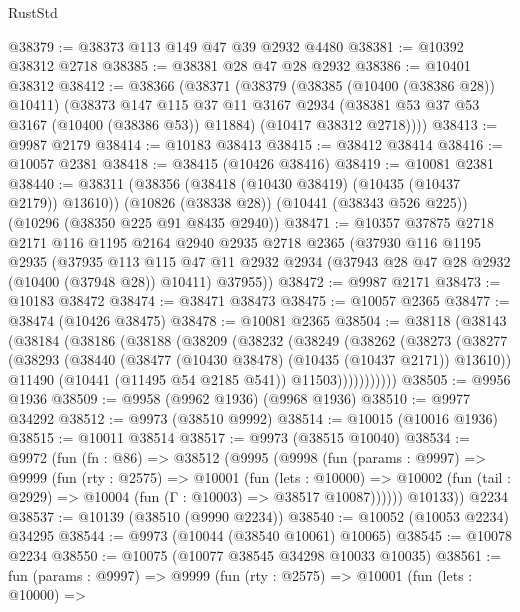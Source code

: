 \begin{lexlean}{RustStd}
\begin{coremodule}
@38379 := @38373 @113 @149 @47 @39 @2932 @4480
@38381 := @10392 @38312 @2718
@38385 := @38381 @28 @47 @28 @2932
@38386 := @10401 @38312
@38412 := @38366
    (@38371
      (@38379
        (@38385 (@10400 (@38386 @28)) @10411)
        (@38373
          @147
          @115
          @37
          @11
          @3167
          @2934
          (@38381 @53 @37 @53 @3167 (@10400 (@38386 @53)) @11884)
          (@10417 @38312 @2718))))
@38413 := @9987 @2179
@38414 := @10183 @38413
@38415 := @38412 @38414
@38416 := @10057 @2381
@38418 := @38415 (@10426 @38416)
@38419 := @10081 @2381
@38440 := @38311
    (@38356 (@38418 (@10430 @38419) (@10435 (@10437 @2179)) @13610))
    (@10826 (@38338 @28))
    (@10441 (@38343 @526 @225))
    (@10296 (@38350 @225 @91 @8435 @2940))
@38471 := @10357
    @37875
    @2718
    @2171
    @116
    @1195
    @2164
    @2940
    @2935
    @2718
    @2365
    (@37930
      @116
      @1195
      @2935
      (@37935
        @113
        @115
        @47
        @11
        @2932
        @2934
        (@37943 @28 @47 @28 @2932 (@10400 (@37948 @28)) @10411)
        @37955))
@38472 := @9987 @2171
@38473 := @10183 @38472
@38474 := @38471 @38473
@38475 := @10057 @2365
@38477 := @38474 (@10426 @38475)
@38478 := @10081 @2365
@38504 := @38118
    (@38143
      (@38184
        (@38186
          (@38188
            (@38209
              (@38232
                (@38249
                  (@38262
                    (@38273
                      (@38277
                        (@38293
                          (@38440 (@38477 (@10430 @38478) (@10435 (@10437 @2171)) @13610))
                          @11490
                          (@10441 (@11495 @54 @2185 @541))
                          @11503)))))))))))
@38505 := @9956 @1936
@38509 := @9958 (@9962 @1936) (@9968 @1936)
@38510 := @9977 @34292
@38512 := @9973 (@38510 @9992)
@38514 := @10015 (@10016 @1936)
@38515 := @10011 @38514
@38517 := @9973 (@38515 @10040)
@38534 := @9972
    (fun (fn : @86) =>
    @38512
      (@9995
        (@9998
          (fun (params : @9997) =>
          @9999
            (fun (rty : @2575) =>
            @10001
              (fun (lets : @10000) =>
              @10002 (fun (tail : @2929) => @10004 (fun (Γ : @10003) => @38517 @10087))))))
        @10133))
    @2234
@38537 := @10139 (@38510 (@9990 @2234))
@38540 := @10052 (@10053 @2234) @34295
@38544 := @9973 (@10044 (@38540 @10061) @10065)
@38545 := @10078 @2234
@38550 := @10075 (@10077 @38545 @34298 @10033 @10035)
@38561 := fun (params : @9997) =>
  @9999
    (fun (rty : @2575) =>
    @10001
      (fun (lets : @10000) =>

\end{coremodule}
\end{lexlean}
